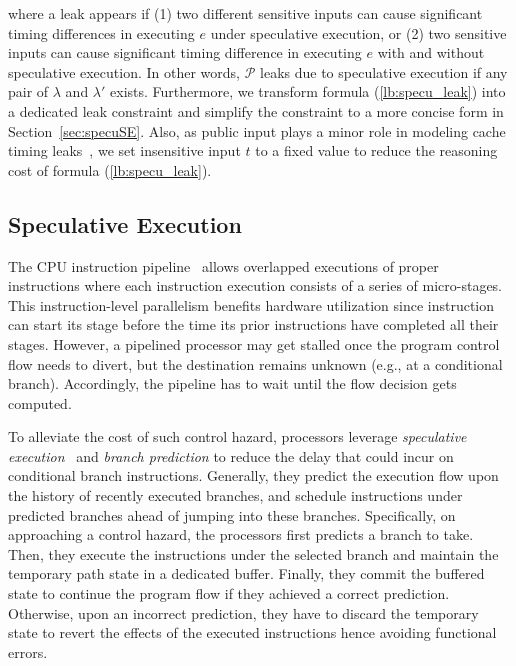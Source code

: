 \documentclass[sigconf]{acmart}
\newcommand\ignore[1]{}
\newcommand{\prog}{\mathcal{P}}
\begin{document}
%
where a leak appears if (1) two different sensitive inputs can cause significant 
timing differences in executing $\mathit{e}$ under speculative execution, or (2) 
two sensitive inputs can cause significant timing difference in executing $\mathit{e}$ 
with and without speculative execution. In other words, $\prog$ leaks due to 
speculative execution if any pair of $\lambda$ and $\lambda'$ exists. Furthermore, 
we transform formula (\ref{lb:specu_leak}) into a dedicated leak constraint and 
simplify the constraint to a more concise form in Section~\ref{sec:specuSE}. Also, 
as public input plays a minor role in modeling cache timing leaks~\cite{WangBLWZW19}, 
we set insensitive input $t$ to a fixed value to reduce the reasoning cost of formula
(\ref{lb:specu_leak}). 


\ignore{
Also, we assume $\prog$ has the same set of instructions on each program path and 
speculative execution only changes the cache state. 
}



\subsection{Speculative Execution}
\label{sec:specu}


The CPU instruction pipeline~\cite{RamamoorthyL77} allows overlapped executions 
of proper instructions where each instruction execution consists of a series of 
micro-stages. This instruction-level parallelism benefits hardware utilization 
since instruction can start its stage before the time its prior instructions 
have completed all their stages. However, a pipelined processor may get stalled 
once the program control flow needs to divert, but the destination remains 
unknown (e.g., at a conditional branch). Accordingly, the pipeline has to wait 
until the flow decision gets computed.


To alleviate the cost of such control hazard, processors leverage 
\textit{speculative execution}~\cite{kimuraKT1996} and \textit{branch prediction}
\cite{Mittal19} to reduce the delay that could incur on conditional branch 
instructions. Generally, they predict the execution flow upon the history of 
recently executed branches, and schedule instructions under predicted branches
ahead of jumping into these branches. Specifically, on approaching a control 
hazard, the processors first predicts a branch to take. Then, they execute the 
instructions under the selected branch and maintain the temporary path state 
in a dedicated buffer. Finally, they commit the buffered state to continue the 
program flow if they achieved a correct prediction. Otherwise, upon an incorrect 
prediction, they have to discard the temporary state to revert the effects of the 
executed instructions hence avoiding functional errors. 
\end{document}
